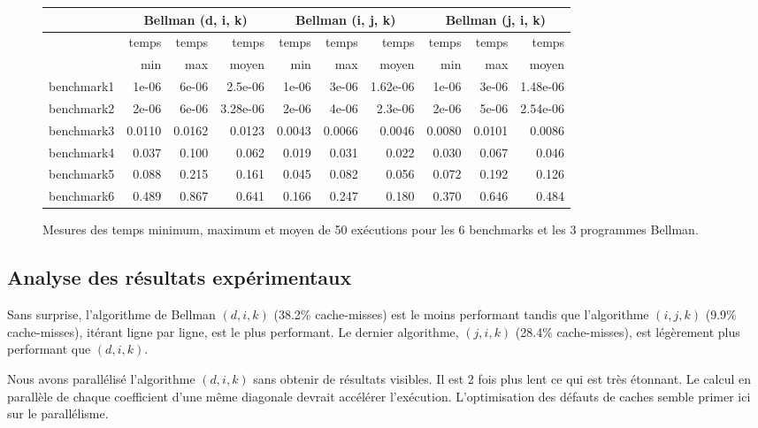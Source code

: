 \documentclass[a4paper, 10pt, french]{article}
\begin{document}
\begin{figure}[h]
  \begin{center}
    \begin{tabular}{|l||r|r|r|r|r|r|r|r|r||}
      \hline
      \hline
      & \multicolumn{3}{c|}{Bellman (d, i, k)} & \multicolumn{3}{c|}{Bellman (i, j, k)} & \multicolumn{3}{c|}{Bellman (j, i, k)}\\
      \hline
                 & temps & temps & temps & temps & temps & temps & temps & temps & temps \\
                 & min   & max   & moyen & min   & max   & moyen & min   & max   & moyen \\
      \hline
      \hline
      benchmark1 & 1e-06 & 6e-06 & 2.5e-06 & 1e-06 & 3e-06 & 1.62e-06 & 1e-06 & 3e-06 & 1.48e-06 \\
      \hline
      benchmark2 & 2e-06 & 6e-06 & 3.28e-06 & 2e-06 & 4e-06 & 2.3e-06 & 2e-06 & 5e-06 & 2.54e-06 \\
      \hline
      benchmark3 & 0.0110 & 0.0162 & 0.0123 & 0.0043 & 0.0066 & 0.0046 & 0.0080 & 0.0101 & 0.0086 \\
      \hline
      benchmark4 & 0.037 & 0.100 & 0.062 & 0.019 & 0.031 & 0.022 & 0.030 & 0.067 & 0.046 \\
      \hline
      benchmark5 & 0.088 & 0.215 & 0.161 & 0.045 & 0.082 & 0.056 & 0.072 & 0.192 & 0.126 \\
      \hline
      benchmark6 & 0.489 & 0.867 & 0.641 & 0.166 & 0.247 & 0.180 & 0.370 & 0.646 & 0.484 \\
      \hline
      \hline
    \end{tabular}
    \caption{Mesures des temps minimum, maximum et moyen de 50 exécutions pour les 6 benchmarks et les 3 programmes Bellman.}
    \label{table-temps}
  \end{center}
\end{figure}

\subsection{Analyse des résultats expérimentaux}

Sans surprise, l'algorithme de Bellman $(d, i, k)$ (38.2\% cache-misses) est le moins performant tandis que l'algorithme $(i, j, k)$ (9.9\% cache-misses), itérant ligne par ligne, est le plus performant. Le dernier algorithme, $(j, i, k)$ (28.4\% cache-misses), est légèrement plus performant que $(d, i, k)$.

Nous avons parallélisé l'algorithme $(d, i, k)$ sans obtenir de résultats visibles. Il est 2 fois plus lent ce qui est très étonnant. Le calcul en parallèle de chaque coefficient d'une même diagonale devrait accélérer l'exécution. L'optimisation des défauts de caches semble primer ici sur le parallélisme.
\end{document}
